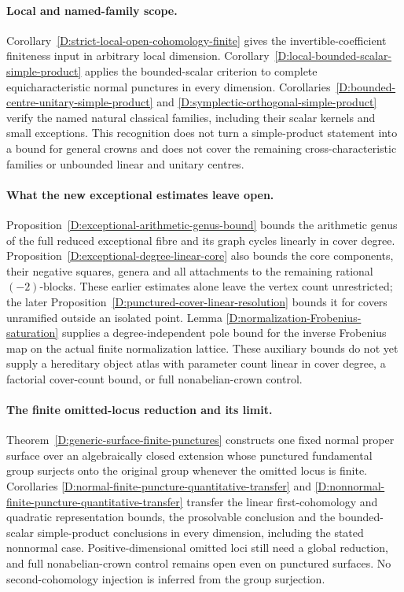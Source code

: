 \paragraph{Local and named-family scope.}
Corollary~\ref{D:strict-local-open-cohomology-finite} gives the
invertible-coefficient finiteness input in arbitrary local dimension.
Corollary~\ref{D:local-bounded-scalar-simple-product} applies the
bounded-scalar criterion to complete equicharacteristic normal punctures
in every dimension. Corollaries~\ref{D:bounded-centre-unitary-simple-product}
and \ref{D:symplectic-orthogonal-simple-product} verify the named natural
classical families, including their scalar kernels and small exceptions.
This recognition does not turn a simple-product statement into a bound
for general crowns and does not cover the remaining cross-characteristic
families or unbounded linear and unitary centres.


\paragraph{What the new exceptional estimates leave open.}
Proposition~\ref{D:exceptional-arithmetic-genus-bound} bounds the
arithmetic genus of the full reduced exceptional fibre and its graph cycles
linearly in cover degree. Proposition~\ref{D:exceptional-degree-linear-core}
also bounds the core components, their negative squares, genera and all
attachments to the remaining rational $(-2)$-blocks. These earlier
estimates alone leave the vertex count unrestricted; the later
Proposition~\ref{D:punctured-cover-linear-resolution} bounds it for
covers unramified outside an isolated point. Lemma
\ref{D:normalization-Frobenius-saturation} supplies a degree-independent
pole bound for the inverse Frobenius map on the actual finite
normalization lattice. These auxiliary bounds do not yet supply a
hereditary object atlas with parameter count linear in cover degree,
a factorial cover-count bound, or full nonabelian-crown control.


\paragraph{The finite omitted-locus reduction and its limit.}
Theorem~\ref{D:generic-surface-finite-punctures} constructs one fixed
normal proper surface over an algebraically closed extension whose
punctured fundamental group surjects onto the original group whenever
the omitted locus is finite. Corollaries
\ref{D:normal-finite-puncture-quantitative-transfer} and
\ref{D:nonnormal-finite-puncture-quantitative-transfer} transfer the
linear first-cohomology and quadratic representation bounds, the
prosolvable conclusion and the bounded-scalar simple-product conclusions
in every dimension, including the stated nonnormal case. Positive-dimensional
omitted loci still need a global reduction, and full nonabelian-crown
control remains open even on punctured surfaces. No second-cohomology
injection is inferred from the group surjection.

